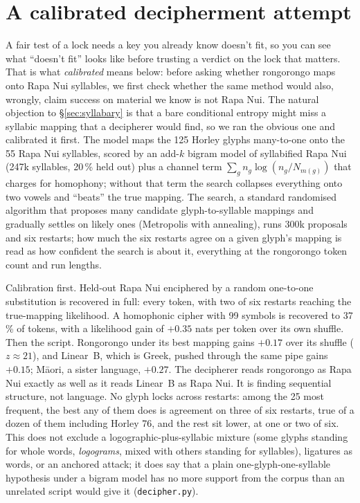 \documentclass[11pt,a4paper]{article}
\begin{document}
\appendix
\section{A calibrated decipherment attempt}
\label{app:decipher}

A fair test of a lock needs a key you already know doesn't fit, so you can see what ``doesn't fit'' looks like before trusting a verdict on the lock that matters. That is what \emph{calibrated} means below: before asking whether rongorongo maps onto Rapa Nui syllables, we first check whether the same method would also, wrongly, claim success on material we know is not Rapa Nui. The natural objection to \S\ref{sec:syllabary} is that a bare conditional entropy might miss a syllabic mapping that a decipherer would find, so we ran the obvious one and calibrated it first. The model maps the 125 Horley glyphs many-to-one onto the 55 Rapa Nui syllables, scored by an add-$k$ bigram model of syllabified Rapa Nui (247k syllables, 20\,\% held out) plus a channel term $\sum_g n_g \log (n_g / N_{m(g)})$ that charges for homophony; without that term the search collapses everything onto two vowels and ``beats'' the true mapping. The search, a standard randomised algorithm that proposes many candidate glyph-to-syllable mappings and gradually settles on likely ones (Metropolis with annealing), runs 300k proposals and six restarts; how much the six restarts agree on a given glyph's mapping is read as how confident the search is about it, everything at the rongorongo token count and run lengths.

Calibration first. Held-out Rapa Nui enciphered by a random one-to-one substitution is recovered in full: every token, with two of six restarts reaching the true-mapping likelihood. A homophonic cipher with 99 symbols is recovered to 37\,\% of tokens, with a likelihood gain of $+0.35$ nats per token over its own shuffle. Then the script. Rongorongo under its best mapping gains $+0.17$ over its shuffle ($z\approx21$), and Linear~B, which is Greek, pushed through the same pipe gains $+0.15$; M\=aori, a sister language, $+0.27$. The decipherer reads rongorongo as Rapa Nui exactly as well as it reads Linear~B as Rapa Nui. It is finding sequential structure, not language. No glyph locks across restarts: among the 25 most frequent, the best any of them does is agreement on three of six restarts, true of a dozen of them including Horley 76, and the rest sit lower, at one or two of six. This does not exclude a logographic-plus-syllabic mixture (some glyphs standing for whole words, \emph{logograms}, mixed with others standing for syllables), ligatures as words, or an anchored attack; it does say that a plain one-glyph-one-syllable hypothesis under a bigram model has no more support from the corpus than an unrelated script would give it (\texttt{decipher.py}).
\end{document}
